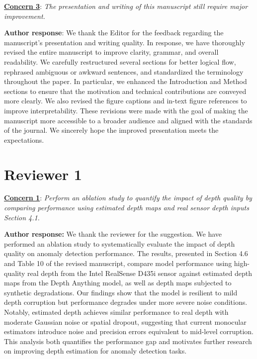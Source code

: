 \documentclass[a4paper,fleqnn]{cas-sc}
\begin{document}
\noindent \textbf{\underline{Concern 3}}: \textit{The presentation and writing of this manuscript still require major improvement. \\}

\noindent \textbf{Author response}: We thank the Editor for the feedback regarding the manuscript's presentation and writing quality. In response, we have thoroughly revised the entire manuscript to improve clarity, grammar, and overall readability. We carefully restructured several sections for better logical flow, rephrased ambiguous or awkward sentences, and standardized the terminology throughout the paper. In particular, we enhanced the Introduction and Method sections to ensure that the motivation and technical contributions are conveyed more clearly. We also revised the figure captions and in-text figure references to improve interpretability. These revisions were made with the goal of making the manuscript more accessible to a broader audience and aligned with the standards of the journal. We sincerely hope the improved presentation meets the expectations.

\section{\textbf{Reviewer 1}}

\noindent \textbf{\underline{Concern 1}}: \textit{Perform an ablation study to quantify the impact of depth quality by comparing performance using estimated depth maps and real sensor depth inputs Section 4.1. \\}

\noindent \textbf{Author response:} We thank the reviewer for the suggestion. We have performed an ablation study to systematically evaluate the impact of depth quality on anomaly detection performance. The results, presented in Section 4.6 and Table 10 of the revised manuscript, compare model performance using high-quality real depth from the Intel RealSense D435i sensor against estimated depth maps from the Depth Anything model, as well as depth maps subjected to synthetic degradations. Our findings show that the model is resilient to mild depth corruption but performance degrades under more severe noise conditions. Notably, estimated depth achieves similar performance to real depth with moderate Gaussian noise or spatial dropout, suggesting that current monocular estimators introduce noise and precision errors equivalent to mid-level corruption. This analysis both quantifies the performance gap and motivates further research on improving depth estimation for anomaly detection tasks.  \\
\end{document}
